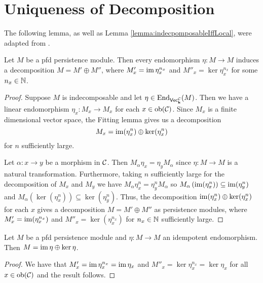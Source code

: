 \chapter{Uniqueness of Decomposition}\label{chap:uniqueness}
The following lemma, as well as Lemma \ref{lemma:indecpomposableIffLocal}, were adapted from \cite[Section 3]{BotnanCrawley_2018}.
\begin{lemma}
    Let $M$ be a pfd persistence module. 
    Then every endomorphism $\eta\colon M\to M$ induces a decomposition $M=M'\oplus M''$, where $M'_x=\operatorname{im}\eta_x^{n_x}$ and $M''_x=\ker\eta_x^{n_x}$ for some $n_x\in\mathbb{N}$. 
\end{lemma}
\begin{proof}
    Suppose $M$ is indecomposable and let $\eta\in\operatorname{End}_{\normalfont\mathsf{Vec}_{\mathbf{k}}^{\mathcal{C}}}(M)$. 
    Then we have a linear endomorphism $\eta_x\colon M_x\to M_x$ for each $x\in\operatorname{ob}(\mathcal{C})$.
    Since $M_x$ is a finite dimensional vector space, the Fitting lemma gives us a decomposition
    \[ M_x=\operatorname{im}(\eta^n_x)\oplus\ker(\eta^n_x) \]
    for $n$ sufficiently large.

    Let $\alpha\colon x\to y$ be a morphism in $\mathcal{C}$. Then $M_\alpha\eta_x=\eta_yM_\alpha$ since $\eta\colon M\to M$ is a natural transformation.
    Furthermore, taking $n$ sufficiently large for the decomposition of $M_x$ and $M_y$ we have $M_\alpha\eta^n_x=\eta^n_yM_\alpha$ so $M_\alpha\left(\operatorname{im}(\eta_x^n)\right)\subseteq\operatorname{im}(\eta_y^n)$ and $M_\alpha\left(\ker(\eta^n_x)\right)\subseteq\ker(\eta^n_y)$.
    Thus, the decomposition $\operatorname{im}(\eta^n_x)\oplus\ker(\eta^n_x)$ for each $x$ gives a decomposition $M=M'\oplus M''$ as persistence modules, where $M'_x=\operatorname{im}(\eta_x^{n_x})$ and $M''_x=\ker(\eta_x^{n_x})$ for $n_x\in\mathbb{N}$ sufficiently large.
\end{proof}
\begin{corollary}\label{cor:ImKerDecomposition}
    Let $M$ be a pfd persistence module and $\eta\colon M\to M$ an idempotent endomorphism.
    Then $M=\operatorname{im}\eta\oplus\ker\eta$.
\end{corollary}
\begin{proof}
    We have that $M'_x=\operatorname{im}\eta_x^{n_x}=\operatorname{im}\eta_x$ and $M''_x=\ker\eta_x^{n_x}=\ker\eta_x$ for all $x\in\operatorname{ob}(\mathcal{C})$ and the result follows.
\end{proof}


